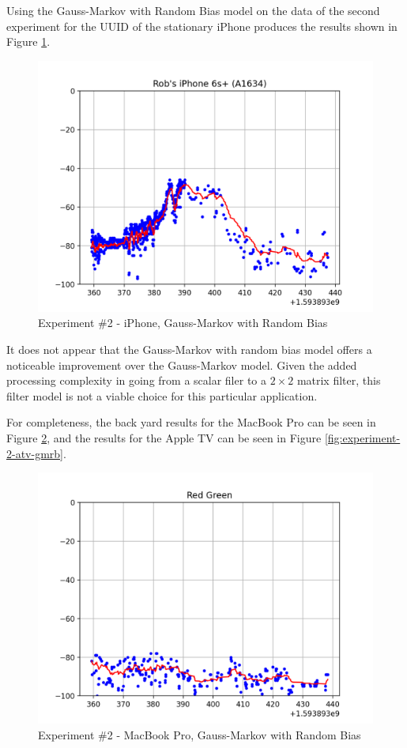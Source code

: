 \documentclass[12pt]{article}
\begin{document}
Using the Gauss-Markov with Random Bias model on the data of the second experiment for
the UUID of the stationary iPhone produces the results shown in Figure
\ref{fig:experiment-2-iphone-gmrb}.

\begin{figure}[ht]
    \centering
    \includegraphics[width=1.0\textwidth]{Experiment-2-iPhone-GMRB.png}
    \caption{Experiment \#2 - iPhone, Gauss-Markov with Random Bias}
    \label{fig:experiment-2-iphone-gmrb}
\end{figure}

It does not appear that the Gauss-Markov with random bias model offers a noticeable
improvement over the Gauss-Markov model. Given the added processing complexity in going
from a scalar filer to a $2 \times 2$ matrix filter, this filter model is not a viable
choice for this particular application.

For completeness, the back yard results for the MacBook Pro can be seen in Figure
\ref{fig:experiment-2-mbp-gmrb}, and the results for the Apple TV can be seen in Figure
\ref{fig:experiment-2-atv-gmrb}.

\begin{figure}[ht]
    \centering
    \includegraphics[width=1.0\textwidth]{Experiment-2-MBP-GMRB.png}
    \caption{Experiment \#2 - MacBook Pro, Gauss-Markov with Random Bias}
    \label{fig:experiment-2-mbp-gmrb}
\end{figure}
\end{document}

